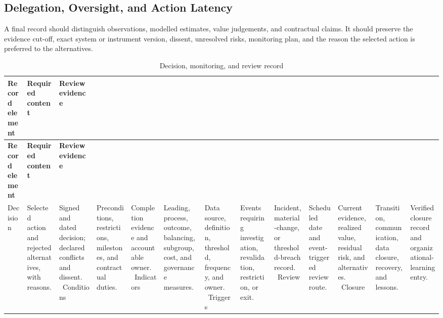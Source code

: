 \subsection{Delegation, Oversight, and Action Latency}
\label{sec:comp-ch03-supp-3}
A final record should distinguish observations, modelled estimates, value
judgements, and contractual claims. It should preserve the evidence cut-off, exact
system or instrument version, dissent, unresolved risks, monitoring plan, and the
reason the selected action is preferred to the alternatives.

\begin{longtable}{@{}p{}p{}p{}@{}}
\caption{Decision, monitoring, and review record}
\label{tab:comp-ch03-decision-record}\\
\toprule
\textbf{Record element} & \textbf{Required content} & \textbf{Review evidence} \\
\midrule
\endfirsthead
\toprule
\textbf{Record element} & \textbf{Required content} & \textbf{Review evidence} \\
\midrule
\endhead
\bottomrule
\endlastfoot
Decision & Selected action and rejected alternatives, with reasons. & Signed and dated decision; declared conflicts and dissent. \
Conditions & Preconditions, restrictions, milestones, and contractual duties. & Completion evidence and accountable owner. \
Indicators & Leading, process, outcome, balancing, subgroup, cost, and governance measures. & Data source, definition, threshold, frequency, and owner. \
Triggers & Events requiring investigation, revalidation, restriction, or exit. & Incident, material-change, or threshold-breach record. \
Review & Scheduled date and event-triggered review route. & Current evidence, realized value, residual risk, and alternatives. \
Closure & Transition, communication, data closure, recovery, and lessons. & Verified closure record and organizational-learning entry. \
\end{longtable}
